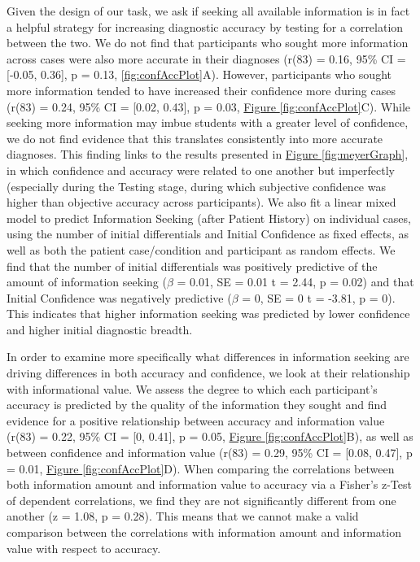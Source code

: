 \documentclass[a4paper, nobind]{templates/ociamthesis}
\begin{document}
Given the design of our task, we ask if seeking all available information is in fact a helpful strategy for increasing diagnostic accuracy by testing for a correlation between the two. We do not find that participants who sought more information across cases were also more accurate in their diagnoses (r(83) = 0.16, 95\% CI = {[}-0.05, 0.36{]}, p = 0.13, \hyperref[fig:confAccPlot]{\ref{fig:confAccPlot}}A). However, participants who sought more information tended to have increased their confidence more during cases (r(83) = 0.24, 95\% CI = {[}0.02, 0.43{]}, p = 0.03, \hyperref[fig:confAccPlot]{Figure \ref{fig:confAccPlot}}C). While seeking more information may imbue students with a greater level of confidence, we do not find evidence that this translates consistently into more accurate diagnoses. This finding links to the results presented in \hyperref[fig:meyerGraph]{Figure \ref{fig:meyerGraph}}, in which confidence and accuracy were related to one another but imperfectly (especially during the Testing stage, during which subjective confidence was higher than objective accuracy across participants). We also fit a linear mixed model to predict Information Seeking (after Patient History) on individual cases, using the number of initial differentials and Initial Confidence as fixed effects, as well as both the patient case/condition and participant as random effects. We find that the number of initial differentials was positively predictive of the amount of information seeking (\(\beta\) = 0.01, SE = 0.01 t = 2.44, p = 0.02) and that Initial Confidence was negatively predictive (\(\beta\) = 0, SE = 0 t = -3.81, p = 0). This indicates that higher information seeking was predicted by lower confidence and higher initial diagnostic breadth.

\hfill\break
In order to examine more specifically what differences in information seeking are driving differences in both accuracy and confidence, we look at their relationship with informational value. We assess the degree to which each participant's accuracy is predicted by the quality of the information they sought and find evidence for a positive relationship between accuracy and information value (r(83) = 0.22, 95\% CI = {[}0, 0.41{]}, p = 0.05, \hyperref[fig:confAccPlot]{Figure \ref{fig:confAccPlot}}B), as well as between confidence and information value (r(83) = 0.29, 95\% CI = {[}0.08, 0.47{]}, p = 0.01, \hyperref[fig:confAccPlot]{Figure \ref{fig:confAccPlot}}D). When comparing the correlations between both information amount and information value to accuracy via a Fisher's z-Test of dependent correlations, we find they are not significantly different from one another (z = 1.08, p = 0.28). This means that we cannot make a valid comparison between the correlations with information amount and information value with respect to accuracy.
\end{document}
